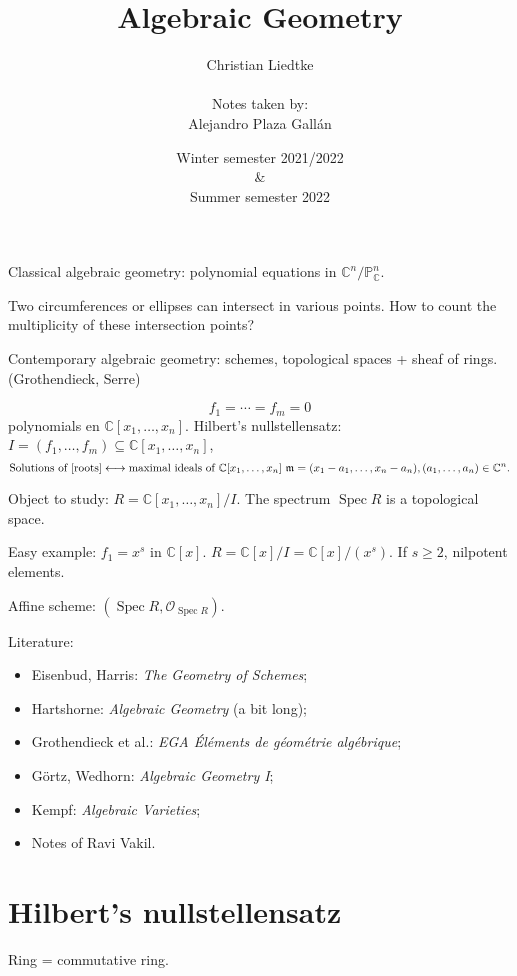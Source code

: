 \documentclass[12pt]{article}
\title{Algebraic Geometry}
\author{Christian Liedtke\\\\Notes taken by:\\Alejandro Plaza Gall\'{a}n}
\date{Winter semester 2021/2022\\\&\\ Summer semester 2022}
\DeclareMathOperator{\Spec}{Spec}
\theoremstyle{definition}
\begin{document}
\maketitle
\tableofcontents
\newpage

Classical algebraic geometry: polynomial equations in $\mathbb{C}^n/\mathbb{P}_{\mathbb{C}}^n$.

Two circumferences or ellipses can intersect in various points. How to count the multiplicity of these intersection points?

Contemporary algebraic geometry: schemes, topological spaces + sheaf of rings. (Grothendieck, Serre)

\begin{equation}\tag{$*$}\label{roots}
f_1=\cdots=f_m=0
\end{equation}
polynomials en $\mathbb{C}[x_1,\ldots,x_n]$. Hilbert's nullstellensatz: $I=(f_1,\ldots,f_m)\subseteq\mathbb{C}[x_1,\ldots,x_n]$,
\[\text{Solutions of \eqref{roots}}\longleftrightarrow\text{maximal ideals of }\mathbb{C}[x_1,\ldots,x_n]\ \mathfrak{m}=(x_1-a_1,\ldots,x_n-a_n),(a_1,\ldots,a_n)\in\mathbb{C}^n.\]

Object to study: $R=\mathbb{C}[x_1,\ldots,x_n]/I$. The spectrum $\Spec R$ is a topological space.

Easy example: $f_1=x^s$ in $\mathbb{C}[x]$. $R=\mathbb{C}[x]/I=\mathbb{C}[x]/(x^s)$. If $s\geq2$, nilpotent elements.

Affine scheme: $(\Spec R,\mathcal{O}_{\Spec R})$.

Literature:
\begin{itemize}
\item[\cite{eisenbud2006geometry}] Eisenbud, Harris: \emph{The Geometry of Schemes};
\item[\cite{hartshorne2013algebraic}] Hartshorne: \emph{Algebraic Geometry} (a bit long);
\item[\cite{dieudonne1971elements}] Grothendieck et al.: \emph{EGA \'{E}l\'{e}ments de g\'{e}om\'{e}trie alg\'{e}brique};
\item[\cite{gortz2010algebraic}] G\"{o}rtz, Wedhorn: \emph{Algebraic Geometry I};
\item[\cite{kempf1993algebraic}] Kempf: \emph{Algebraic Varieties};
\item[\cite{vakil2006foundations}] Notes of Ravi Vakil.
\end{itemize}

\section{Hilbert's nullstellensatz}
Ring = commutative ring.
\end{document}
